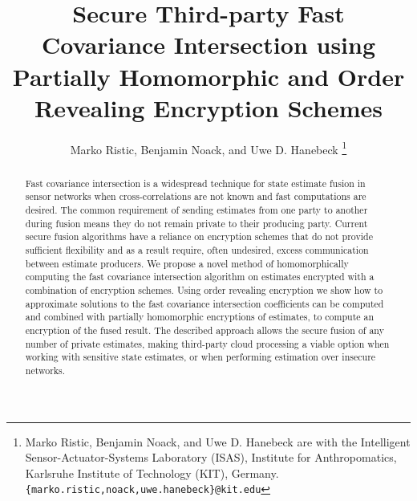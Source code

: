 \documentclass[letterpaper, 10 pt, conference]{ieeeconf}  %
\title{\LARGE \bf
Secure Third-party Fast Covariance Intersection using Partially Homomorphic and Order Revealing Encryption Schemes
}
\author{Marko Ristic, Benjamin Noack, and Uwe D. Hanebeck%
\thanks{Marko Ristic, Benjamin Noack, and Uwe D. Hanebeck are with the Intelligent Sensor-Actuator-Systems Laboratory (ISAS), Institute for Anthropomatics, Karlsruhe Institute of Technology (KIT), Germany.\newline
{\tt\small \{marko.ristic,noack,uwe.hanebeck\}@kit.edu}%
}%
}
\begin{document}
\maketitle
\thispagestyle{empty}
\pagestyle{empty}




\begin{abstract}

Fast covariance intersection is a widespread technique for state estimate fusion in sensor networks when cross-correlations are not known and fast computations are desired. The common requirement of sending estimates from one party to another during fusion means they do not remain private to their producing party. Current secure fusion algorithms have a reliance on encryption schemes that do not provide sufficient flexibility and as a result require, often undesired, excess communication between estimate producers. We propose a novel method of homomorphically computing the fast covariance intersection algorithm on estimates encrypted with a combination of encryption schemes. Using order revealing encryption we show how to approximate solutions to the fast covariance intersection coefficients can be computed and combined with partially homomorphic encryptions of estimates, to compute an encryption of the fused result. The described approach allows the secure fusion of any number of private estimates, making third-party cloud processing a viable option when working with sensitive state estimates, or when performing estimation over insecure networks.

\end{abstract}



\end{document}
